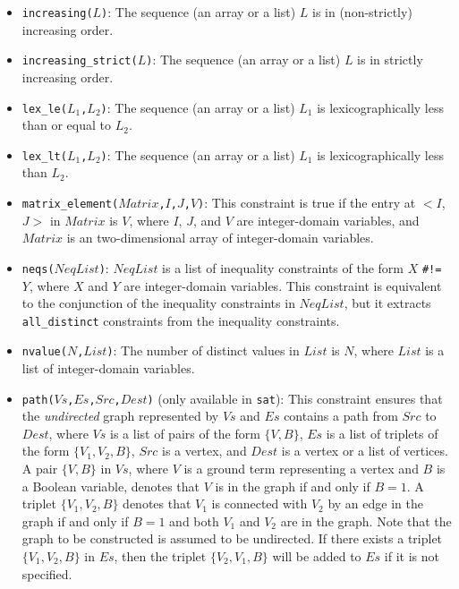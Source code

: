 \begin{itemize}
\item \texttt{increasing($L$)}: The sequence (an array or a list) $L$ is in (non-strictly) increasing order.

\item \texttt{increasing\_strict($L$)}: The sequence (an array or a list) $L$ is in strictly increasing order.

\item \texttt{lex\_le($L_1$,$L_2$)}: The sequence (an array or a list) $L_1$ is lexicographically less than or equal to $L_2$.

\item \texttt{lex\_lt($L_1$,$L_2$)}: The sequence (an array or a list) $L_1$ is lexicographically less than $L_2$.

\item \texttt{matrix\_element($Matrix$,$I$,$J$,$V$)}: This constraint is true if the entry at $<$$I$,$J$$>$ in $Matrix$ is $V$, where $I$, $J$, and $V$ are integer-domain variables, and $Matrix$ is an two-dimensional array of integer-domain variables.

\item \texttt{neqs($NeqList$)}: $NeqList$ is a list of inequality constraints of the form $X$ \verb+#!=+ $Y$, where $X$ and $Y$ are integer-domain variables. This constraint is equivalent to the conjunction of the inequality constraints in $NeqList$, but it extracts \texttt{all\_distinct} constraints from the inequality constraints. 

\item \texttt{nvalue($N$,$List$)}: The number of distinct values in $List$ is $N$, where $List$ is a list of integer-domain variables.

\item \texttt{path($Vs$,$Es$,$Src$,$Dest$)} (only available in \texttt{sat}): This constraint ensures that the \textit{undirected} graph represented by $Vs$ and $Es$ contains a path from $Src$ to $Dest$, where $Vs$ is a list of pairs of the form $\{V,B\}$, $Es$ is a list of triplets of the form $\{V_1,V_2,B\}$, $Src$ is a vertex, and $Dest$ is a vertex or a list of vertices. A pair $\{V,B\}$ in $Vs$, where $V$ is a ground term representing a vertex and $B$ is a Boolean variable, denotes that $V$ is in the graph if and only if $B = 1$. A triplet $\{V_1,V_2,B\}$ denotes that $V_1$ is connected with $V_2$  by an edge in the graph if and only if $B = 1$ and both $V_1$ and $V_2$ are in the graph. Note that the graph to be constructed is assumed to be undirected. If there exists a triplet $\{V_1,V_2,B\}$ in $Es$, then the triplet $\{V_2,V_1,B\}$ will be added to $Es$ if it is not specified.


\end{itemize}
